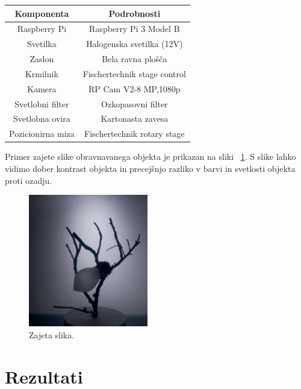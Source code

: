 \documentclass[journal,a4paper,twoside]{sty/IEEEtran}
\begin{document}
\begin{center}
	\centering
	\captionsetup{singlelinecheck = false, justification=justified}
	\label{tab:komponente} 
\begin{tabular}{|c|c|}
	\hline
	\textbf{Komponenta} & \textbf{Podrobnosti}                            \\ \hline
	Raspberry Pi        & Raspberry Pi 3 Model B                          \\ \hline
	Svetilka            & Halogenska svetilka (12V)            \\ \hline
	Zaslon              & Bela ravna plošča                               \\ \hline
	Krmilnik            & Fischertechnik stage control                \\ \hline
	Kamera              & RP Cam V2-8 MP,1080p \\ \hline
	Svetlobni filter    & Ozkopasovni filter         \\ \hline
	Svetlobna ovira     & Kartonasta zavesa                \\ \hline
		Pozicionirna miza   & Fischertechnik rotary stage                     \\ \hline
\end{tabular}
\end{center}
Primer zajete slike obravnavanega objekta je prikazan na sliki ~\ref{fig:zajeta_slika}. S slike lahko vidimo dober kontrast objekta in precejšnjo razliko v barvi in svetlosti objekta proti ozadju. 

\begin{figure}[H]
	\centerline{\includegraphics[width=5.2cm]{fig/zajeta_slika}}
	\caption{Zajeta slika.}
	\label{fig:zajeta_slika}
\end{figure}

\section{Rezultati}
\end{document}
